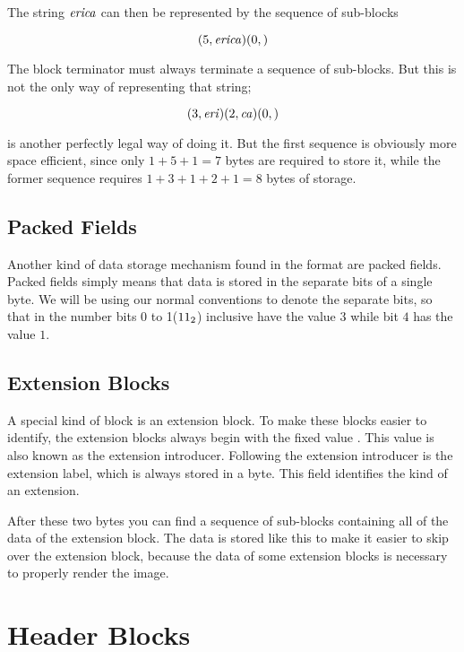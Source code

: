 The string $\mathit{erica}$ can then be represented by the sequence of
sub-blocks

\begin{equation*}
  (5,\mathit{erica})(0,)
\end{equation*}

The block terminator must always terminate a sequence of
sub-blocks. But this is not the only way of representing that string;

\begin{equation*}
  (3,\mathit{eri})(2,\mathit{ca})(0,)
\end{equation*}

is another perfectly legal way of doing it. But the first sequence is
obviously more space efficient, since only $1 + 5 + 1 = 7$ bytes are
required to store it, while the former sequence requires $1 + 3 + 1 +
2 + 1 = 8$ bytes of storage.

\subsection{Packed Fields}

Another kind of data storage mechanism found in the \gif format are
packed fields. Packed fields simply means that data is stored in the
separate bits of a single byte. We will be using our normal conventions
to denote the separate bits, so that in the number  bits 0
to 1($\mbox{\ensuremath{11_2}}$) inclusive have the value $3$ while bit $4$ has the value
$1$.

\subsection{Extension Blocks}

A special kind of block is an extension block. To make these blocks
easier to identify, the extension blocks always begin with the fixed
value . This value is also known as the extension
introducer. Following the extension
introducer is the extension label, which is always stored in a
byte. This field identifies the kind of an extension.

After these two bytes you can find a sequence of sub-blocks containing
all of the data of the extension block. The data is stored like this
to make it easier to skip over the extension block, because the data
of some extension blocks is necessary to properly render the image.

\section{Header Blocks}

